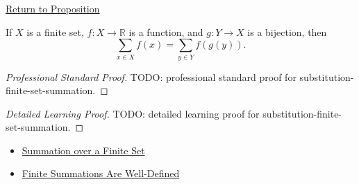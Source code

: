 \newpage
{}
\label{prf:substitution-finite-set-summation}

\begin{remark*}[Return]
\hyperref[prop:substitution-finite-set-summation]{Return to Proposition}
\end{remark*}

\begin{proposition*}
If \(X\) is a finite set, \(f:X\to\mathbb{R}\) is a function, and
\(g:Y\to X\) is a bijection, then
\[
  \sum_{x\in X} f(x)
  =
  \sum_{y\in Y} f(g(y)).
\]
\end{proposition*}

\begin{proof}[Professional Standard Proof]
\LRAProofBodyStart
TODO: professional standard proof for substitution-finite-set-summation.
\end{proof}

\begin{proof}[Detailed Learning Proof]
\LRAProofBodyStart
TODO: detailed learning proof for substitution-finite-set-summation.
\end{proof}

\begin{remark*}
\end{remark*}

\begin{dependencies}
\begin{itemize}
  \item \hyperref[def:summation-over-finite-set]{Summation over a Finite Set}
  \item \hyperref[prop:finite-summations-well-defined]{Finite Summations Are Well-Defined}
\end{itemize}
\end{dependencies}

\clearpage
